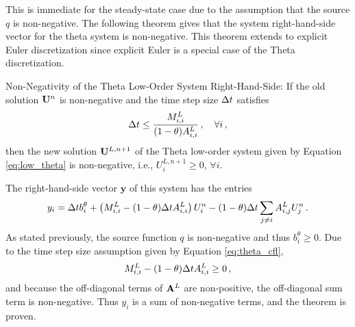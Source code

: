 
This is immediate for the steady-state case due to the assumption that the
source $q$ is non-negative. The following theorem gives that the system
right-hand-side vector for the theta system is non-negative. This theorem
extends to explicit Euler discretization since explicit Euler is a special case
of the Theta discretization.
\begin{thm}{Non-Negativity of the Theta Low-Order System Right-Hand-Side:}
  If the old solution $\mathbf{U}^n$ is non-negative and
  the time step size $\Delta t$ satisfies
\begin{equation}\label{eq:theta_cfl}
   \Delta t \leq \frac{M^L_{i,i}}{(1-\theta)A_{i,i}^L}
    \,,\quad\forall i \,,
\end{equation}
  then the new solution $\mathbf{U}^{L,n+1}$ of the Theta low-order
  system given by Equation \eqref{eq:low_theta} is non-negative, i.e.,
  $U^{L,n+1}_i \geq 0$, $\forall i$.
\end{thm}

\begin{prf}
The right-hand-side vector $\mathbf{y}$ of this system has the entries
\[
  y_i = \Delta t b^\theta_i + \left(M^L_{i,i} - (1-\theta)\Delta t A^L_{i,i}\right) U^n_i
      - (1-\theta)\Delta t\sum\limits_{j\ne i} A^L_{i,j} U^n_j
  \,.
\]
As stated previously, the source function $q$ is non-negative and
thus $b^\theta_i \ge 0 $. Due to the time step size assumption
given by Equation \eqref{eq:theta_cfl},
\[
  M^L_{i,i} - (1-\theta)\Delta t A^L_{i,i} \geq 0 \,,
\]
and because the off-diagonal terms of $\mathbf{A}^L$ are non-positive, the off-diagonal
sum term is non-negative. Thus $y_i$ is a sum of non-negative
terms, and the theorem is proven.
\end{prf}
